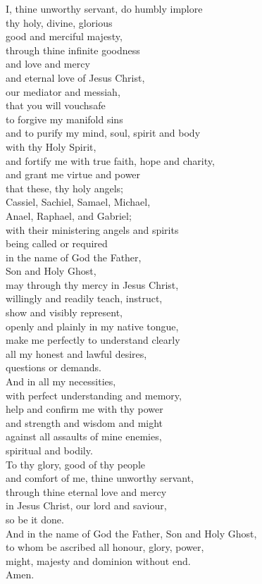 \documentclass[10pt,openany]{book}
\begin{document}
{  I, thine unworthy servant, do humbly implore\\
  thy holy, divine, glorious \\
  good and merciful majesty,\\
  through thine infinite goodness \\
  and love and mercy\\
  and eternal love of Jesus Christ,\\
  our mediator and messiah,\\
  that you will vouchsafe \\
  to forgive my manifold sins\\
  and to purify my mind, soul, spirit and body\\
  with thy Holy Spirit,\\
  and fortify me with true faith, hope and charity,\\
  and grant me virtue and power\\
  that these, thy holy angels;\\
  Cassiel, Sachiel, Samael, Michael,\\
  Anael, Raphael, and Gabriel;\\
  with their ministering angels and spirits\\
  being called or required\\
  in the name of God the Father, \\
  Son and Holy Ghost,\\
  may through thy mercy in Jesus Christ,\\
  willingly and readily teach, instruct,\\
  show and visibly represent,\\
  openly and plainly in my native tongue,\\
  make me perfectly to understand clearly\\
  all my honest and lawful desires,\\
  questions or demands.\\[8pt]
  And in all my necessities,\\
  with perfect understanding and memory,\\
  help and confirm me with thy power\\
  and strength and wisdom and might\\
  against all assaults of mine enemies,\\
  spiritual and bodily.\\
  To thy glory, good of thy people\\
  and comfort of me, thine unworthy servant,\\
  through thine eternal love and mercy\\
  in Jesus Christ, our lord and saviour,\\
  so be it done.\\[8pt]
  And in the name of God the Father, Son and Holy Ghost,\\
  to whom be ascribed all honour, glory, power,\\
  might, majesty and dominion without end.\\[8pt]
  Amen.
}
\end{document}
